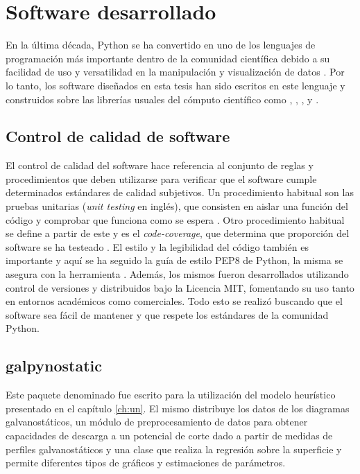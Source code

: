 \chapter{Software desarrollado}\label{a:software}

En la última década, Python se ha convertido en uno de los lenguajes de programación 
más importante dentro de la comunidad científica debido a su facilidad de uso y 
versatilidad en la manipulación y visualización de datos \cite{millman2011}. 
Por lo tanto, los software diseñados en esta tesis han sido escritos en este
lenguaje y construidos sobre las librerías usuales del cómputo científico como
 \cite{numpy},  \cite{scipy},  \cite{pandas}, 
 \cite{matplotlib} y  \cite{sklearn1, sklearn2}. 


\section{Control de calidad de software}\label{software:control}

El control de calidad del software hace referencia al conjunto de reglas y 
procedimientos que deben utilizarse para verificar que el software cumple 
determinados estándares de calidad subjetivos. Un procedimiento habitual son las 
pruebas unitarias (\textit{unit testing} en inglés), que consisten en aislar una 
función del código y comprobar que funciona como se espera \cite{jazayeri2007}. 
Otro procedimiento habitual se define a partir de este y es el 
\textit{code-coverage}, que determina que proporción del software se ha testeado
\cite{miller1963}. El estilo y la legibilidad del código también es importante
y aquí se ha seguido la guía de estilo PEP8 de Python, la misma se asegura con 
la herramienta . Además, los mismos fueron desarrollados utilizando control 
de versiones  y distribuidos bajo la Licencia MIT, fomentando su uso tanto en 
entornos académicos como comerciales. Todo esto se realizó buscando que el 
software sea fácil de mantener y que respete los estándares de la comunidad Python.


\section{galpynostatic}\label{software:galpynostatic}

Este paquete denominado  fue escrito para la utilización
del modelo heurístico presentado en el capítulo \ref{ch:un}. El mismo distribuye 
los datos de los diagramas galvanostáticos, un módulo de preprocesamiento de datos
para obtener capacidades de descarga a un potencial de corte dado a partir de 
medidas de perfiles galvanostáticos y una clase que realiza la regresión sobre la 
superficie y permite diferentes tipos de gráficos y estimaciones de parámetros.

